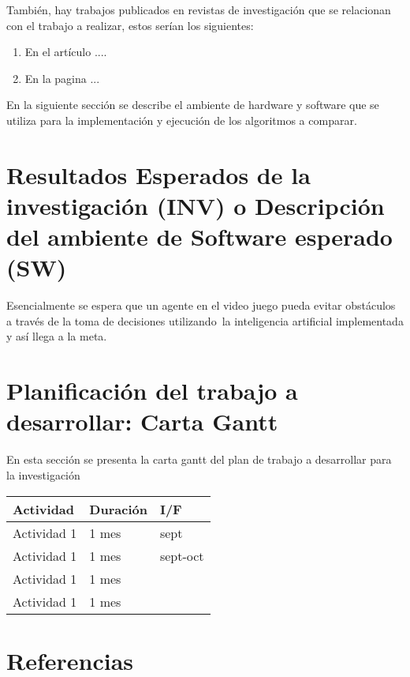 \documentclass[spanish]{article}
\begin{document}
	También, hay trabajos publicados en revistas de investigación que se relacionan con el trabajo a realizar, estos serían los siguientes:
	\begin{enumerate}
		\item En el artículo ....
		\item En la pagina ...

	\end{enumerate}

	En la siguiente sección se describe el ambiente de hardware y software que se utiliza para la implementación y ejecución de los algoritmos a comparar.



\section{Resultados Esperados de la investigación (INV) o Descripción del ambiente de Software esperado (SW)}

Esencialmente se espera que un agente en el video juego pueda evitar obstáculos a través de la toma de decisiones utilizando\
la inteligencia artificial implementada y así llega a la meta.

\section{Planificación del trabajo a desarrollar: Carta Gantt}

	En esta sección se presenta la carta gantt del plan de trabajo a desarrollar para la investigación

\begin{table}[H]
\centering
\begin{tabular}{|l|l|l|}
\hline
\textbf{Actividad}      & \textbf{Duración} & \textbf{I/F} \\ \hline
Actividad 1             & 1 mes            &  sept\\ \hline
Actividad 1             & 1 mes            &  sept-oct\\ \hline
Actividad 1             & 1 mes            &  \\ \hline
Actividad 1             & 1 mes             & \\ \hline
\end{tabular}%
\end{table}

\section{Referencias}


\end{document}
